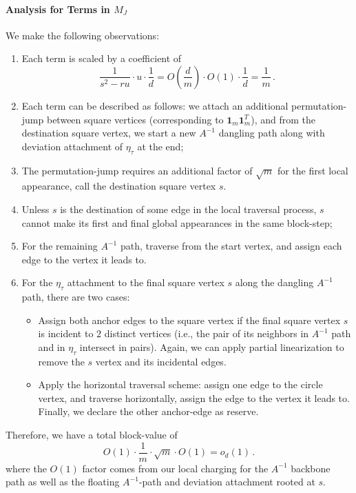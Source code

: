 \documentclass[12pt]{article}
\def\1{\bm{1}}
\begin{document}
\paragraph{Analysis for Terms in $M_J$}
We make the following observations:
\begin{enumerate}
	\item Each term is scaled by a coefficient of \[ 
	\frac{1}{s^2-ru} \cdot u  \cdot \frac{1}{d} = O(\frac{d}{m}) \cdot O(1) \cdot \frac{1}{d} =\frac{1}{m} \,.  
	\]
	\item Each term can be described as follows: we attach an additional permutation-jump between square vertices (corresponding to $\1_m\1_m^T$), and from the destination square vertex, we start a new $A^{-1}$ dangling path along with deviation attachment of $\eta_\tau$ at the end;
	\item The permutation-jump requires an additional factor of $\sqrt{m}$ for the first local appearance, call the destination square vertex $s$.  
	\item Unless $s$ is the destination of some edge in the local traversal process, $s$ cannot make its first and final global appearances in the same block-step;
	\item For the remaining $A^{-1}$ path, traverse from the start vertex, and assign each edge to the vertex it leads to. 
	\item For the $\eta_\tau$ attachment to the final square vertex $s$ along the dangling $A^{-1}$ path, there are two cases:
	\begin{itemize}
		\item Assign both anchor edges to the square vertex if the final square vertex  $s$ is incident to $2$ distinct vertices (i.e., the pair of its neighbors in $A^{-1}$ path and in $\eta_\tau$ intersect in pairs). Again, we can apply partial linearization to remove the $s$ vertex and its incidental edges.
		\item Apply the horizontal traversal scheme: assign one edge to the circle vertex, and traverse horizontally, assign the edge to the vertex it leads to. Finally, we declare the other anchor-edge as reserve.
	\end{itemize} 
	 \end{enumerate}
Therefore, we have a total block-value of \[ 
O(1) \cdot \frac{1}{m} \cdot \sqrt{m} \cdot O(1) = o_d(1)\,.
\]
where the $O(1)$ factor comes from our local charging for the $A^{-1}$ backbone path as well as the floating $A^{-1}$-path and deviation attachment rooted at $s$.
\end{document}
